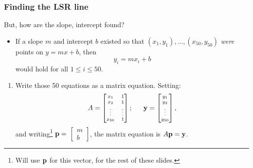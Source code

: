 \documentclass{beamer}
\theoremstyle{example}
\begin{document}
\begin{frame}[fragile]
\frametitle{Finding the LSR line}

But, how are the slope, intercept found?

\pause
\begin{itemize}
    \item If a slope $m$ and intercept $b$ existed so that $(x_1,y_1),\ldots,(x_{50},y_{50})$ \emph{were} points on $y = mx+b$, then 
    \[y_i = mx_i + b\]
would hold for all $1\le i\le 50$.
\end{itemize}

\pause
\begin{enumerate}
    \item Write those 50 equations as a matrix equation. Setting: 
    \[{\scriptsize A = \begin{bmatrix}x_1 & 1 \\ x_2 & 1 \\ \vdots & \vdots \\ x_{50} & 1\end{bmatrix}; \qquad 
      {\bf y} = \begin{bmatrix}y_1 \\ y_2 \\ \vdots \\ y_{50}\end{bmatrix}, }\]
    and writing\footnote{Will use ${\bf p}$ for this vector, for the rest of these slides.} ${\bf p} = $ {\small $\begin{bmatrix}m\\ b\end{bmatrix}$}, the matrix equation is $A{\bf p} = {\bf y}$.
\end{enumerate}
    
\vfill
\end{frame}
    
\end{document}

